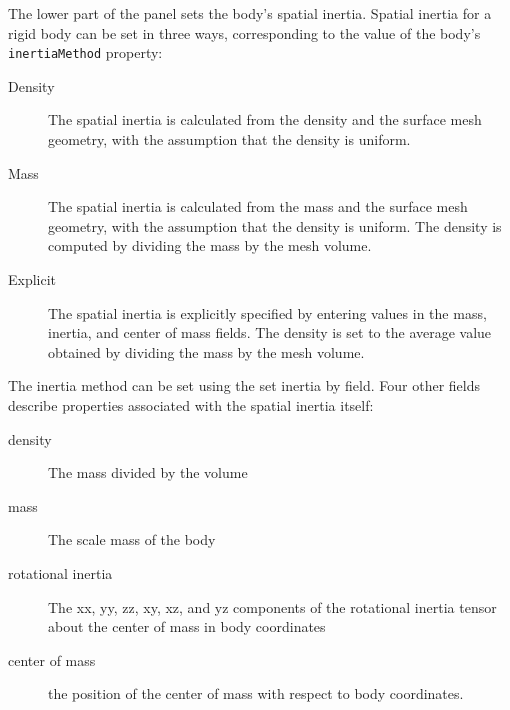 \documentclass{article}
\begin{document}
The lower part of the panel sets the body's spatial inertia.
Spatial inertia for a rigid body can be set in three ways,
corresponding to the value of the body's {\tt inertiaMethod} property:

\begin{description}

\item[Density]\mbox{}
 
The spatial inertia is calculated from the density and the surface
mesh geometry, with the assumption that the density is uniform.

\item[Mass]\mbox{}

The spatial inertia is calculated from the mass and the surface
mesh geometry, with the assumption that the density is uniform.
The density is computed by dividing the mass by the mesh volume.

\item[Explicit]\mbox{}

The spatial inertia is explicitly specified by entering
values in the mass, inertia, and center of mass fields. The density is
set to the average value obtained by dividing the mass by the
mesh volume.

\end{description}

The inertia method can be set using the {\sf set inertia by} field.  Four
other fields describe properties associated with the spatial inertia
itself: 

\begin{description}

\item[density]\mbox{}

The mass divided by the volume

\item[mass]\mbox{}

The scale mass of the body

\item[rotational inertia]\mbox{}

The xx, yy, zz, xy, xz, and yz components of the
rotational inertia tensor about the center of mass in body
coordinates

\item[center of mass]\mbox{}

the position of the center of mass
with respect to body coordinates.

\end{description}
\end{document}
